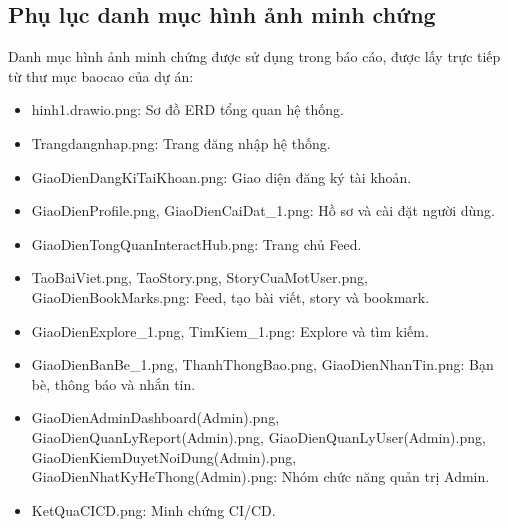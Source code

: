 \documentclass[a4paper]{article}
\begin{document}
\clearpage

    \subsection{Phụ lục danh mục hình ảnh minh chứng}
    Danh mục hình ảnh minh chứng được sử dụng trong báo cáo, được lấy trực tiếp từ thư mục baocao của dự án:
    \begin{itemize}
        \item hinh1.drawio.png: Sơ đồ ERD tổng quan hệ thống.
        \item Trangdangnhap.png: Trang đăng nhập hệ thống.
        \item GiaoDienDangKiTaiKhoan.png: Giao diện đăng ký tài khoản.
        \item GiaoDienProfile.png, GiaoDienCaiDat\_1.png: Hồ sơ và cài đặt người dùng.
        \item GiaoDienTongQuanInteractHub.png: Trang chủ Feed.
        \item TaoBaiViet.png, TaoStory.png, StoryCuaMotUser.png, GiaoDienBookMarks.png: Feed, tạo bài viết, story và bookmark.
        \item GiaoDienExplore\_1.png, TimKiem\_1.png: Explore và tìm kiếm.
        \item GiaoDienBanBe\_1.png, ThanhThongBao.png, GiaoDienNhanTin.png: Bạn bè, thông báo và nhắn tin.
        \item GiaoDienAdminDashboard(Admin).png, GiaoDienQuanLyReport(Admin).png, GiaoDienQuanLyUser(Admin).png, GiaoDienKiemDuyetNoiDung(Admin).png, GiaoDienNhatKyHeThong(Admin).png: Nhóm chức năng quản trị Admin.
        \item KetQuaCICD.png: Minh chứng CI/CD.
    \end{itemize}

\clearpage
\end{document}
